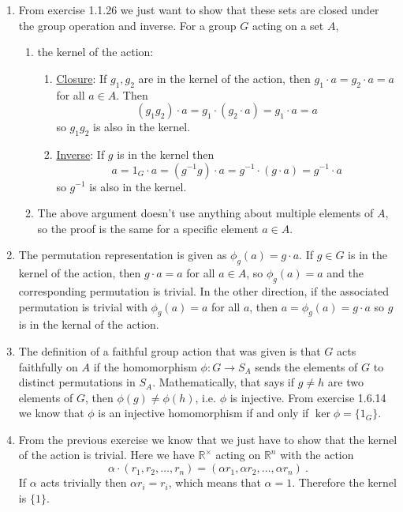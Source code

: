 \documentclass[]{article}
\newcommand{\bbr}{\mathbb{R}}
\begin{document}
\begin{enumerate}
\item From exercise 1.1.26 we just want to show that these sets are closed under the group operation and inverse. For a group $G$ acting on a set $A$,
\begin{enumerate}
\item the kernel of the action:
\begin{enumerate}
\item \underline{Closure}: If $g_1, g_2$ are in the kernel of the action, then $g_1 \cdot a = g_2 \cdot a = a$ for all $a\in A$. Then \begin{equation}
(g_1g_2)\cdot a = g_1\cdot (g_2\cdot a) = g_1\cdot a = a
\end{equation} 
so $g_1g_2$ is also in the kernel.
\item \underline{Inverse}: If $g$ is in the kernel then
\begin{equation}
a = 1_G\cdot a = (g^{-1}g)\cdot a = g^{-1}\cdot (g\cdot a) = g^{-1}\cdot a
\end{equation}
so $g^{-1}$ is also in the kernel.
\end{enumerate}
\item The above argument doesn't use anything about multiple elements of $A$, so the proof is the same for a specific element $a \in A$. 
\end{enumerate}


\item The permutation representation is given as $\phi_g(a) = g\cdot a$. If $g \in G$ is in the kernel of the action, then $g\cdot a = a$ for all $a\in A$, so $\phi_g(a) = a$ and the corresponding permutation is trivial. In the other direction, if the associated permutation is trivial with $\phi_g(a) = a$ for all $a$, then $a = \phi_g(a) = g\cdot a$ so $g$ is in the kernal of the action.


\item The definition of a faithful group action that was given is that $G$ acts faithfully on $A$ if the homomorphism $\phi: G\to S_A$ sends the elements of $G$ to distinct permutations in $S_A$. Mathematically, that says if $g\neq h$ are two elements of $G$, then $\phi(g) \neq \phi(h)$, i.e. $\phi$ is injective. From exercise 1.6.14 we know that $\phi$ is an injective homomorphism if and only if $\ker\phi = \{1_G\}$.


\item From the previous exercise we know that we just have to show that the kernel of the action is trivial. Here we have $\bbr^\times$ acting on $\bbr^n$ with the action
\begin{equation}
\alpha\cdot (r_1,r_2,\ldots,r_n) = (\alpha r_1,\alpha r_2,\ldots,\alpha r_n)\ .
\end{equation}
If $\alpha$ acts trivially then $\alpha r_i = r_i$, which means that $\alpha = 1$. Therefore the kernel is $\{1\}$.



\end{enumerate}
\end{document}
